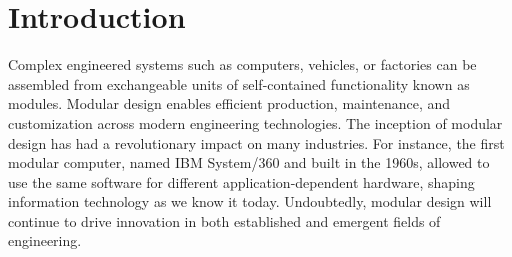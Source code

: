 \chapter{Introduction} \label{ch:introduction}


Complex engineered systems such as computers, vehicles, or factories can be assembled from exchangeable units of self-contained functionality known as modules.
Modular design enables efficient production, maintenance, and customization across modern engineering technologies.
The inception of modular design has had a revolutionary impact on many industries.
For instance, the first modular computer, named IBM System/360 and built in the 1960s, allowed to use the same software for different application-dependent hardware, shaping information technology as we know it today. Undoubtedly, modular design will continue to drive innovation in both established and emergent fields of engineering.

